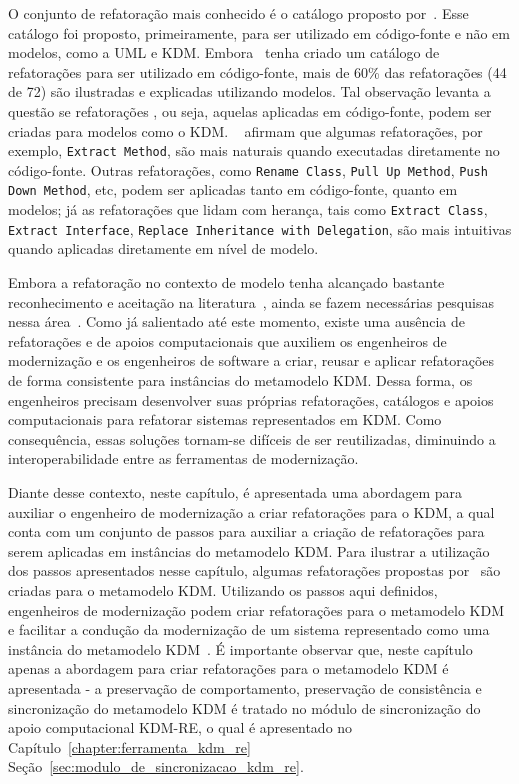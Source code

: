 O conjunto de refatoração mais conhecido é o catálogo proposto por~. Esse catálogo foi proposto, primeiramente, para ser utilizado em código-fonte e não em modelos, como a UML e KDM. Embora~ tenha criado um catálogo de refatorações para ser utilizado em código-fonte, mais de 60\% das refatorações (44 de 72) são ilustradas e explicadas utilizando modelos. Tal observação levanta a questão se refatorações , ou seja, aquelas aplicadas em código-fonte, podem ser criadas para modelos como o KDM. ~ afirmam que algumas refatorações, por exemplo, \texttt{Extract Method}, são mais naturais quando executadas diretamente no código-fonte. Outras refatorações, como \texttt{Rename Class}, \texttt{Pull Up Method}, \texttt{Push Down Method}, etc, podem ser aplicadas tanto em código-fonte, quanto em modelos; já as refatorações que lidam com herança, tais como \texttt{Extract Class}, \texttt{Extract Interface}, \texttt{Replace Inheritance with Delegation}, são mais intuitivas quando aplicadas diretamente em nível de modelo. 

Embora a refatoração no contexto de modelo tenha alcançado bastante reconhecimento e aceitação na literatura~\cite{Moghadam_2012, Maneerat_2011, Fourati_2011, Einarsson_2012, Steimann_2015, Akiyama_2011, Jensen_2010, Arendt_2012, Millan_2009, Tom_2008_2008}, ainda se fazem necessárias pesquisas nessa área~\cite{durelli_systematic_mapping, revisao_sistematica_uml_refactoring}. Como já salientado até este momento, existe uma ausência de refatorações e de apoios computacionais que auxiliem os engenheiros de modernização e os engenheiros de software a criar, reusar e aplicar refatorações de forma consistente para instâncias do metamodelo KDM. Dessa forma, os engenheiros precisam desenvolver suas próprias refatorações, catálogos e apoios computacionais para refatorar sistemas representados em KDM. Como consequência, essas soluções tornam-se difíceis de ser reutilizadas, diminuindo a interoperabilidade entre as ferramentas de modernização. 

Diante desse contexto, neste capítulo, é apresentada uma abordagem para auxiliar o engenheiro de modernização a criar refatorações para o KDM, a qual conta com um conjunto de passos para auxiliar a criação de refatorações para serem aplicadas em instâncias do metamodelo KDM. Para ilustrar a utilização dos passos apresentados nesse capítulo, algumas refatorações propostas por~ são criadas para o metamodelo KDM. Utilizando os passos aqui definidos, engenheiros de modernização podem criar refatorações para o metamodelo KDM e facilitar a condução da modernização de um sistema representado como uma instância do metamodelo KDM~\cite{durelli_catalogo, durelli_VEM_ferramenta}. É importante observar que, neste capítulo apenas a abordagem para criar refatorações para o metamodelo KDM é apresentada - a preservação de comportamento, preservação de consistência e sincronização do metamodelo KDM é tratado no módulo de sincronização do apoio computacional KDM-RE, o qual é apresentado no Capítulo~\ref{chapter:ferramenta_kdm_re}  Seção~\ref{sec:modulo_de_sincronizacao_kdm_re}.


